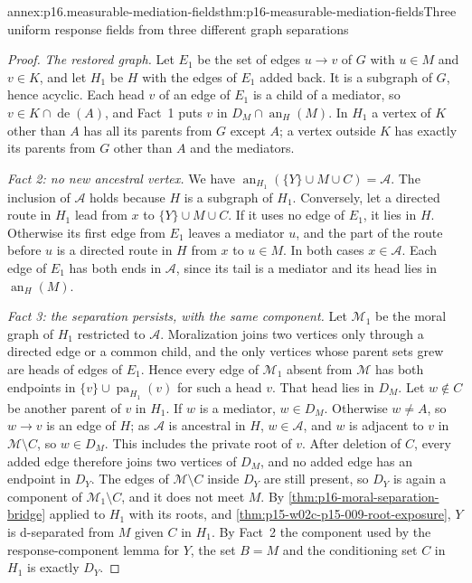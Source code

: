 \begin{annexitem}{annex:p16.measurable-mediation-fields}{thm:p16-measurable-mediation-fields}{Three uniform response fields from three different graph separations}
\begin{proof}
\emph{The restored graph.} Let \(E_1\) be the set of edges \(u\to v\)
of \(G\) with \(u\in M\) and \(v\in K\), and let \(H_1\) be \(H\) with
the edges of \(E_1\) added back. It is a subgraph of \(G\), hence
acyclic. Each head \(v\) of an edge of \(E_1\) is a child of a mediator,
so \(v\in K\cap\operatorname{de}(A)\), and Fact~1 puts \(v\) in
\(D_M\cap\operatorname{an}_H(M)\). In \(H_1\) a vertex of \(K\) other
than \(A\) has all its parents from \(G\) except \(A\); a vertex outside
\(K\) has exactly its parents from \(G\) other than \(A\) and the
mediators.

\emph{Fact 2: no new ancestral vertex.} We have
\(\operatorname{an}_{H_1}(\{Y\}\cup M\cup C)=\mathcal A\). The inclusion
of \(\mathcal A\) holds because \(H\) is a subgraph of \(H_1\).
Conversely, let a directed route in \(H_1\) lead from \(x\) to
\(\{Y\}\cup M\cup C\). If it uses no edge of \(E_1\), it lies in \(H\).
Otherwise its first edge from \(E_1\) leaves a mediator \(u\), and the
part of the route before \(u\) is a directed route in \(H\) from \(x\)
to \(u\in M\). In both cases \(x\in\mathcal A\). Each edge of \(E_1\)
has both ends in \(\mathcal A\), since its tail is a mediator and its
head lies in \(\operatorname{an}_H(M)\).

\emph{Fact 3: the separation persists, with the same component.} Let
\(\mathcal M_1\) be the moral graph of \(H_1\) restricted to
\(\mathcal A\). Moralization joins two vertices only through a directed
edge or a common child, and the only vertices whose parent sets grew
are heads of edges of \(E_1\). Hence every edge of \(\mathcal M_1\)
absent from \(\mathcal M\) has both endpoints in
\(\{v\}\cup\operatorname{pa}_{H_1}(v)\) for such a head \(v\). That head
lies in \(D_M\). Let \(w\notin C\) be another parent of \(v\) in
\(H_1\). If \(w\) is a mediator, \(w\in D_M\). Otherwise \(w\neq A\),
so \(w\to v\) is an edge of \(H\); as \(\mathcal A\) is ancestral in
\(H\), \(w\in\mathcal A\), and \(w\) is adjacent to \(v\) in
\(\mathcal M\setminus C\), so \(w\in D_M\). This includes the private
root of \(v\). After deletion of \(C\), every added edge therefore joins
two vertices of \(D_M\), and no added edge has an endpoint in \(D_Y\).
The edges of \(\mathcal M\setminus C\) inside \(D_Y\) are still present,
so \(D_Y\) is again a component of \(\mathcal M_1\setminus C\), and it
does not meet \(M\). By \cref{thm:p16-moral-separation-bridge} applied to
\(H_1\) with its roots, and \cref{thm:p15-w02c-p15-009-root-exposure},
\(Y\) is d-separated from \(M\) given \(C\) in \(H_1\). By Fact~2 the
component used by the response-component lemma for \(Y\), the set
\(B=M\) and the conditioning set \(C\) in \(H_1\) is exactly \(D_Y\).


\end{proof}
\end{annexitem}
